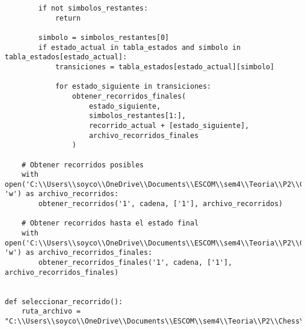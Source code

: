 \begin{enumerate}
\begin{lstlisting}
        if not simbolos_restantes:
            return

        simbolo = simbolos_restantes[0]
        if estado_actual in tabla_estados and simbolo in tabla_estados[estado_actual]:
            transiciones = tabla_estados[estado_actual][simbolo]

            for estado_siguiente in transiciones:
                obtener_recorridos_finales(
                    estado_siguiente,
                    simbolos_restantes[1:],
                    recorrido_actual + [estado_siguiente],
                    archivo_recorridos_finales
                )

    # Obtener recorridos posibles
    with open('C:\\Users\\soyco\\OneDrive\\Documents\\ESCOM\\sem4\\Teoria\\P2\\Chess\\output\\recorridos_blanca.txt', 'w') as archivo_recorridos:
        obtener_recorridos('1', cadena, ['1'], archivo_recorridos)

    # Obtener recorridos hasta el estado final
    with open('C:\\Users\\soyco\\OneDrive\\Documents\\ESCOM\\sem4\\Teoria\\P2\\Chess\\output\\recorridos_finales_blanca.txt', 'w') as archivo_recorridos_finales:
        obtener_recorridos_finales('1', cadena, ['1'], archivo_recorridos_finales)


def seleccionar_recorrido():
    ruta_archivo = "C:\\Users\\soyco\\OneDrive\\Documents\\ESCOM\\sem4\\Teoria\\P2\\Chess\\output\\recorridos_finales_blanca.txt"
    

\end{lstlisting}
\end{enumerate}

